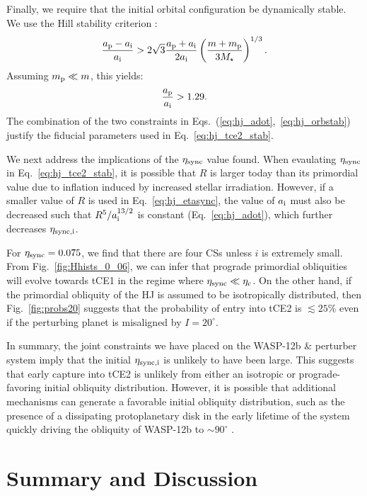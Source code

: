 \documentclass[
        fleqn,
        usenatbib,
    ]{mnras}
\newcommand*{\p}[1]{\left(#1\right)}
\begin{document}
Finally, we require that the initial orbital configuration be dynamically
stable. We use the Hill stability criterion \citep[e.g.][]{petit2020path}:
\begin{equation}
    \frac{a_{\rm p} - a_{\rm i}}{a_{\rm i}} > 2\sqrt{3}\frac{a_{\rm p} + a_{\rm
        i}}{2a_{\rm i}} \p{\frac{m + m_{\rm p}}{3M_{\star}}}^{1/3}.
\end{equation}
Assuming $m_{\rm p} \ll m$, this yields:
\begin{equation}
    \frac{a_{\rm p}}{a_{\rm i}} > 1.29.\label{eq:hj_orbstab}
\end{equation}
The combination of the two constraints in
Eqs.~(\ref{eq:hj_adot},~\ref{eq:hj_orbstab}) justify the fiducial parameters
used in Eq.~\eqref{eq:hj_tce2_stab}.

We next address the implications of the $\eta_{\rm sync}$ value found. When
evaulating $\eta_{\rm sync}$ in Eq.~\eqref{eq:hj_tce2_stab}, it is possible
that $R$ is larger today than its primordial value due to inflation induced by
increased stellar irradiation. However, if a smaller value of $R$ is used in
Eq.~\eqref{eq:hj_etasync}, the value of $a_{\rm i}$ must also be decreased such
that $R^5 / a_{\rm i}^{13/2}$ is constant (Eq.~\ref{eq:hj_adot}), which further
decreases $\eta_{\rm sync, i}$.

For $\eta_{\rm sync} = 0.075$, we find that there are four CSs unless $i$ is
extremely small. From Fig.~\ref{fig:Hhists_0_06}, we can infer that prograde
primordial obliquities will evolve towards tCE1 in the regime where $\eta_{\rm
sync} \ll \eta_{\rm c}$. On the other hand, if the primordial obliquity of the
HJ is assumed to be isotropically distributed, then Fig.~\ref{fig:probs20}
suggests that the probability of entry into tCE2 is $\lesssim 25\%$ even if
the perturbing planet is misaligned by $I = 20^\circ$.

In summary, the joint constraints we have placed on the WASP-12b \& perturber
system imply that the initial $\eta_{\rm sync, i}$ is unlikely to have been
large. This suggests that early capture into tCE2 is unlikely from either an
isotropic or prograde-favoring initial obliquity distribution. However, it is
possible that additional mechanisms can generate a favorable initial obliquity
distribution, such as the presence of a dissipating protoplanetary disk in the
early lifetime of the system quickly driving the obliquity of WASP-12b to $\sim
90^\circ$ \citep{millholland_disk, su2020}.

\section{Summary and Discussion}\label{s:summary}
\end{document}

